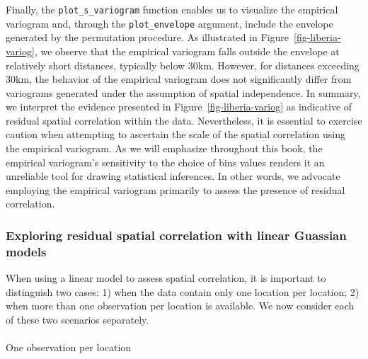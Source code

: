 \documentclass[
  letterpaper,
]{krantz}
\makeatletter
\let\oldparagraph\paragraph
\renewcommand{\paragraph}{
    \@ifstar
      \xxxParagraphStar
      \xxxParagraphNoStar
  }
\newcommand{\xxxParagraphStar}[1]{\oldparagraph*{#1}\mbox{}}
\newcommand{\xxxParagraphNoStar}[1]{\oldparagraph{#1}\mbox{}}
\makeatother
\begin{document}
Finally, the \texttt{plot\_s\_variogram} function enables us to
visualize the empirical variogram and, through the
\texttt{plot\_envelope} argument, include the envelope generated by the
permutation procedure. As illustrated in
Figure~\ref{fig-liberia-variog}, we observe that the empirical variogram
falls outside the envelope at relatively short distances, typically
below 30km. However, for distances exceeding 30km, the behavior of the
empirical variogram does not significantly differ from variograms
generated under the assumption of spatial independence. In summary, we
interpret the evidence presented in Figure~\ref{fig-liberia-variog} as
indicative of residual spatial correlation within the data.
Nevertheless, it is essential to exercise caution when attempting to
ascertain the scale of the spatial correlation using the empirical
variogram. As we will emphasize throughout this book, the empirical
variogram's sensitivity to the choice of bins values renders it an
unreliable tool for drawing statistical inferences. In other words, we
advocate employing the empirical variogram primarily to assess the
presence of residual correlation.

\subsubsection{Exploring residual spatial correlation with linear
Guassian models}\label{sec-empirical-variog-lm}

When using a linear model to assess spatial correlation, it is important
to distinguish two cases: 1) when the data contain only one location per
location; 2) when more than one observation per location is available.
We now consider each of these two scenarios separately.

\paragraph{One observation per
location}\label{one-observation-per-location}
\end{document}
